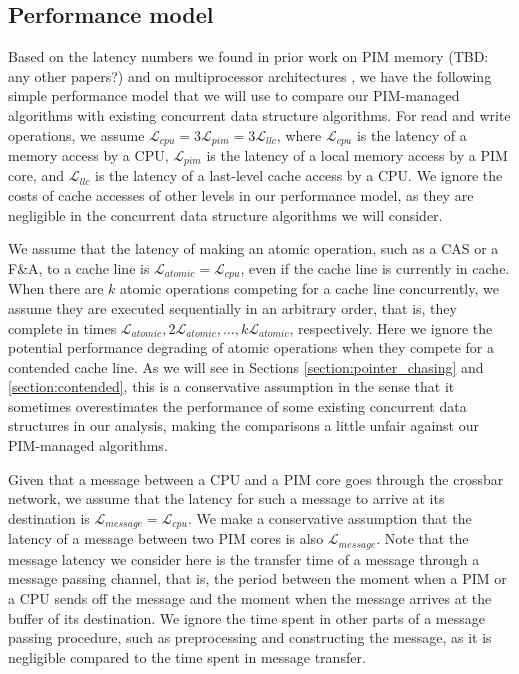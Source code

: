 \documentclass[11pt, letterpaper]{article}   	%
\newcommand{\latpim} {\mathcal{L}_{pim}}
\newcommand{\latcpu} {\mathcal{L}_{cpu}}
\newcommand{\latllc} {\mathcal{L}_{llc}}
\newcommand{\latato} {\mathcal{L}_{atomic}}
\newcommand{\latmes} {\mathcal{L}_{message}}
\begin{document}
\subsection{Performance model}
\label{section:performance_model}
Based on the latency numbers we found in prior work on PIM memory \cite{Azarkhish16} 
(TBD: any other papers?) and on multiprocessor architectures \cite{David13},
we have the following simple performance model that we will use to compare
our PIM-managed algorithms with existing concurrent data structure algorithms.
For read and write operations, we assume $\latcpu = 3\latpim = 3\latllc$,
where $\latcpu$ is the latency of a memory access by a CPU,
$\latpim$ is the latency of a local memory access by a PIM core, and
$\latllc$ is the latency of a last-level cache access by a CPU.
We ignore the costs of cache accesses of other levels in our performance model,
as they are negligible in the concurrent data structure algorithms we will consider.

We assume that the latency of making an atomic operation, such as a CAS or a F\&A,
to a cache line is $\latato = \latcpu$, even if the cache line is currently in cache.
When there are $k$ atomic operations competing for a cache line concurrently,
we assume they are executed sequentially in an arbitrary order, that is,
they complete in times $\latato, 2\latato,..., k\latato$, respectively.
Here we ignore the potential performance degrading of atomic operations
when they compete for a contended cache line.
As we will see in Sections \ref{section:pointer_chasing} and
\ref{section:contended}, this is a conservative assumption
in the sense that it sometimes overestimates the performance of some existing
concurrent data structures in our analysis,
making the comparisons a little unfair against our PIM-managed algorithms.

Given that a message between a CPU and a PIM core goes through
the crossbar network, we assume that the latency for such a message to
arrive at its destination is $\latmes = \latcpu$.
We make a conservative assumption that the latency of a message
between two PIM cores is also $\latmes$.
Note that the message latency we consider here is the transfer time of a message
through a message passing channel, that is, the period between the moment
when a PIM or a CPU sends off the message and the moment when
the message arrives at the buffer of its destination.
We ignore the time spent in other parts of a message passing procedure,
such as preprocessing and constructing the message,
as it is negligible compared to the time spent in message transfer.
\end{document}
